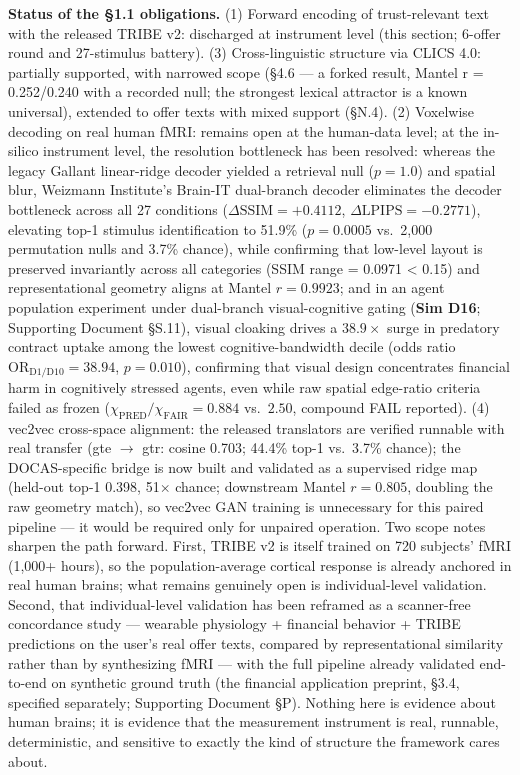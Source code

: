\documentclass[
]{article}
\begin{document}
\textbf{Status of the §1.1 obligations.} (1) Forward encoding of
trust-relevant text with the released TRIBE v2: discharged at instrument
level (this section; 6-offer round and 27-stimulus battery). (3)
Cross-linguistic structure via CLICS 4.0: partially supported, with
narrowed scope (§4.6 --- a forked result, Mantel r = 0.252/0.240 with a
recorded null; the strongest lexical attractor is a known universal),
extended to offer texts with mixed support (§N.4). (2) Voxelwise
decoding on real human fMRI: remains open at the human-data level; at
the in-silico instrument level, the resolution bottleneck has been
resolved: whereas the legacy Gallant linear-ridge decoder yielded a
retrieval null (\(p = 1.0\)) and spatial blur, Weizmann Institute's
Brain-IT dual-branch decoder eliminates the decoder bottleneck across
all 27 conditions (\(\Delta\text{SSIM} = +0.4112\),
\(\Delta\text{LPIPS} = -0.2771\)), elevating top-1 stimulus
identification to 51.9\% (\(p = 0.0005\) vs.~2,000 permutation nulls and
3.7\% chance), while confirming that low-level layout is preserved
invariantly across all categories (SSIM range = 0.0971 \textless{} 0.15)
and representational geometry aligns at Mantel \(r = 0.9923\); and in an
agent population experiment under dual-branch visual-cognitive gating
(\textbf{Sim D16}; Supporting Document §S.11), visual cloaking drives a
\(38.9\times\) surge in predatory contract uptake among the lowest
cognitive-bandwidth decile (odds ratio
\(\text{OR}_{\text{D1}/\text{D10}} = 38.94\), \(p = 0.010\)), confirming
that visual design concentrates financial harm in cognitively stressed
agents, even while raw spatial edge-ratio criteria failed as frozen
(\(\chi_{\text{PRED}}/\chi_{\text{FAIR}} = 0.884\) vs.~\(2.50\),
compound FAIL reported). (4) vec2vec cross-space alignment: the released
translators are verified runnable with real transfer (gte \(\to\) gtr:
cosine 0.703; 44.4\% top-1 vs.~3.7\% chance); the DOCAS-specific bridge
is now built and validated as a supervised ridge map (held-out top-1
0.398, 51\(\times\) chance; downstream Mantel \(r = 0.805\), doubling
the raw geometry match), so vec2vec GAN training is unnecessary for this
paired pipeline --- it would be required only for unpaired operation.
Two scope notes sharpen the path forward. First, TRIBE v2 is itself
trained on 720 subjects' fMRI (1,000+ hours), so the population-average
cortical response is already anchored in real human brains; what remains
genuinely open is individual-level validation. Second, that
individual-level validation has been reframed as a scanner-free
concordance study --- wearable physiology + financial behavior + TRIBE
predictions on the user's real offer texts, compared by representational
similarity rather than by synthesizing fMRI --- with the full pipeline
already validated end-to-end on synthetic ground truth (the financial
application preprint, §3.4, specified separately; Supporting Document
§P). Nothing here is evidence about human brains; it is evidence that
the measurement instrument is real, runnable, deterministic, and
sensitive to exactly the kind of structure the framework cares about.
\end{document}
